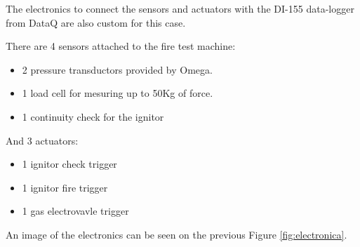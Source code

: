 The electronics to connect the sensors and actuators with the DI-155 data-logger from DataQ are also custom for this case.

There are 4 sensors attached to the fire test machine:
\begin{itemize}
  \item 2 pressure transductors provided by Omega.
  \item 1 load cell for mesuring up to 50Kg of force.
  \item 1 continuity check for the ignitor
\end{itemize}

And 3 actuators:
\begin{itemize}
  \item 1 ignitor check trigger
  \item 1 ignitor fire trigger
  \item 1 gas electrovavle trigger
\end{itemize}

An image of the electronics can be seen on the previous Figure \ref{fig:electronica}.
